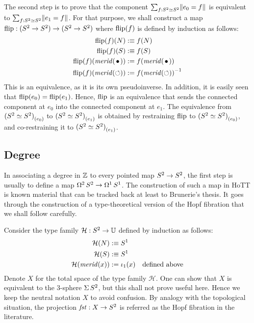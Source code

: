 \documentclass[english,a4]{article}
\def\U{\universe U}%
\begin{document}
The second step is to prove that the component
$\sum_{f:{S^2} \simeq {S^2}}\lVert e_0=f\rVert$ is equivalent to
$\sum_{f:{S^2} \simeq {S^2}}\lVert e_1=f\rVert$. For that purpose, we shall
construct a map $\operatorname{flip} : ({S^2} \to {S^2}) \to ({S^2} \to {S^2})$ where $\operatorname{flip}(f)$
is defined by induction as follows:
\begin{equation}
  \label{eq:19}
  \begin{aligned}
    \flip(f)(N) &\defequi f(N)
    \\
    \flip(f)(S) &\defequi f(S)
    \\
    \flip(f)(\mrd(\base)) &\defis f(\mrd(\base))
    \\
    \flip(f)(\mrd(\Sloop)) &\defis \inv{f(\mrd(\Sloop))}
  \end{aligned}
\end{equation}
This is an equivalence, as it is its own pseudoinverse. In addition,
it is easily seen that $\operatorname{flip}(e_0) = \operatorname{flip}(e_1)$. Hence, $\operatorname{flip}$ is an
equivalence that sends the connected component at $e_0$ into the
connected component at $e_1$. The equivalence from
${({S^2}\simeq{S^2})}_{(e_0)}$ to ${({S^2}\simeq{S^2})}_{(e_1)}$ is
obtained by restraining $\operatorname{flip}$ to ${({S^2}\simeq{S^2})}_{(e_0)}$, and
co-restraining it to ${({S^2}\simeq{S^2})}_{(e_1)}$.

\subsection{Degree}
\label{sec:winding-numbers}
\def\hopffam{\mathcal H}%

In associating a degree in $\mathbb{Z}$ to every pointed map ${S^2} \to {S^2}$,
the first step is usually to define a map
$\mathop{\Omega^{2}} {S^2} \to \mathop{\Omega^{1}} {S^1}$. The construction of such a
map in HoTT is known material that can be tracked back at least to
Brunerie's thesis. It goes through the construction of a
type-theoretical version of the Hopf fibration that we shall follow
carefully.

Consider the type family $\hopffam : \Sp \to \U$ defined by induction
as follows:
\begin{equation}
  \label{eq:7}
  \begin{aligned}
    \hopffam (N) &\defequi \Sc
    \\
    \hopffam (S) &\defequi \Sc
    \\
    \hopffam (\mrd(x)) &\defis \iota_1(x) \quad\text{defined above}
  \end{aligned}
\end{equation}
Denote $X$ for the total space of the type family $\hopffam$. One can
show that $X$ is equivalent to the 3-sphere $\operatorname{\Sigma}{{S^2}}$, but this
shall not prove useful here. Hence we keep the neutral notation $X$ to
avoid confusion. By analogy with the topological situation, the
projection $\mathop{\mathit{fst}} : X\to {S^2}$ is referred as the Hopf fibration in the
literature.
\end{document}
